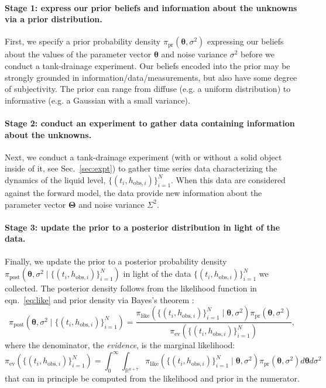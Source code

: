 \documentclass[openacc]{rsproca_new}%
\newcommand\thedata {$\{(t_i,h_{\text{obs}, i})\}_{i=1}^{N}$\xspace}
\newcommand\thedatanomath {\{(t_i,h_{\text{obs}, i})\}_{i=1}^{N}}
\begin{document}
\vspace{-\baselineskip}
\paragraph{Stage 1: express our prior beliefs and information about the unknowns via a prior distribution.}
First, we specify a prior probability density $\pi_{\text{pr}}(\boldsymbol \theta, \sigma^2)$ expressing our beliefs about the values of the parameter vector $\boldsymbol \theta$ and noise variance $\sigma^2$ before we conduct a tank-drainage experiment.
Our beliefs encoded into the prior may be strongly grounded in information/data/measurements, but also have some degree of subjectivity.
The prior can range from diffuse (e.g. a uniform distribution) to informative (e.g. a Gaussian with a small variance). \cite{van2021bayesian}

\vspace{-\baselineskip}
\paragraph{Stage 2: conduct an experiment to gather data containing information about the unknowns.}
Next, we conduct a tank-drainage experiment (with or without a solid object inside of it, see Sec.~\ref{sec:expt}) to gather time series data characterizing the dynamics of the liquid level, \thedata. When this data are considered against the forward model, the data provide new information about the parameter vector $\boldsymbol \Theta$ and noise variance $\Sigma^2$.

\vspace{-\baselineskip}
\paragraph{Stage 3: update the prior to a posterior distribution in light of the data.}
Finally, we update the prior to a posterior probability density $\pi_{\text{post}}(\boldsymbol \theta, \sigma^2 \mid \thedatanomath)$ in light of the data \thedata we collected. 
The posterior density follows from the likelihood function in eqn.~\ref{eq:like} and prior density via Bayes's theorem \cite{van2021bayesian,calvetti2018inverse}:
\begin{equation}
	\pi_{\text{post}}(\boldsymbol \theta, \sigma^2 \mid \thedatanomath) = \frac{
	\pi_{\text{like}}(\thedatanomath \mid \boldsymbol \theta, \sigma^2 ) 
	\pi_{\text{pr}}(\boldsymbol \theta, \sigma^2)
	}{
	\pi_{\text{ev}}(\thedatanomath) 
	}, \label{eq:post}
\end{equation} where the denominator, the \emph{evidence}, is the marginal likelihood:
\begin{equation}
    \pi_{\text{ev}}(\thedatanomath) = \int_0^\infty \int_{\mathbb{R}^{n+7}} \pi_{\text{like}}(\thedatanomath \mid \boldsymbol \theta, \sigma^2 )  
	\pi_{\text{pr}}(\boldsymbol \theta, \sigma^2)  d \boldsymbol\theta d\sigma^2 \label{eq:ev}
\end{equation}
that can in principle be computed from the likelihood and prior in the numerator. 
\end{document}
